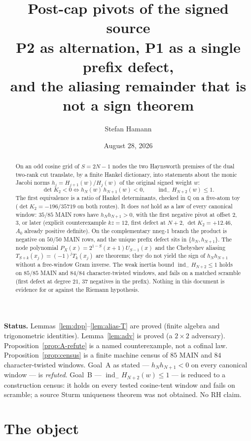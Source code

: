 \documentclass[11pt]{article}
\title{\bfseries Post-cap pivots of the signed source\\[2mm]
\large P2 as alternation, P1 as a single prefix defect,\\
and the aliasing remainder that is not a sign theorem}
\author{Stefan Hamann}
\date{August 28, 2026}
\theoremstyle{remark}
\newcommand{\indm}{\operatorname{ind}_{-}}
\begin{document}
\maketitle

\begin{abstract}\noindent
On an odd cosine grid of $S=2N-1$ nodes the two Haynsworth
premises of the dual two-rank cut translate, by a finite Hankel
dictionary, into statements about the monic Jacobi norms
$h_j=H_{j+1}(w)/H_j(w)$ of the original signed weight $w$:
\[
\det K_2<0\iff h_N(w)\,h_{N+1}(w)<0,
\qquad
\indm H_{N+2}(w)\le 1.
\]
The first equivalence is a ratio of Hankel determinants, checked
in $\mathbb{Q}$ on a five-atom toy ($\det K_2=-196/35719$ on both
routes).  It does \emph{not} hold as a law of every canonical
window: $35/85$ MAIN rows have $h_N h_{N+1}>0$, with the first
negative pivot at offset $2$, $3$, or later (explicit
counterexample $kz=12$, first defect at $N+2$, $\det K_2=+12.46$,
$A_0$ already positive definite).  On the complementary
nneg-$1$ branch the product is negative on $50/50$ MAIN rows, and
the unique prefix defect sits in $\{h_N,h_{N+1}\}$.  The node
polynomial $P_X(x)=2^{1-S}(x+1)U_{S-1}(x)$ and the Chebyshev
aliasing $T_{S+k}(x_j)=(-1)^j T_k(x_j)$ are theorems; they do not
yield the sign of $h_N h_{N+1}$ without a free-window Gram inverse.
The weak inertia bound $\indm H_{N+2}\le 1$ holds on $85/85$ MAIN
and $84/84$ character-twisted windows, and fails on a matched
scramble (first defect at degree $21$, $37$ negatives in the
prefix).  Nothing in this document is evidence for or against
the Riemann hypothesis.
\end{abstract}

\medskip\noindent
\textbf{Status.}\enspace
Lemmas~\ref{lem:dpp}--\ref{lem:alias-T} are proved (finite
algebra and trigonometric identities).
Lemma~\ref{lem:adv} is proved (a $2\times 2$ adversary).
Proposition~\ref{prop:A-refute} is a named counterexample, not a
cofinal law.
Proposition~\ref{prop:census} is a finite machine census of $85$
MAIN and $84$ character-twisted windows.
Goal~A as stated --- $h_N h_{N+1}<0$ on every canonical window ---
is \emph{refuted}.
Goal~B --- $\indm H_{N+2}(w)\le 1$ --- is reduced to a
construction census: it holds on every tested cosine-tent window
and fails on scramble; a source Sturm uniqueness theorem was not
obtained.
No RH claim.

\section{The object}\label{sec:obj}
\end{document}
